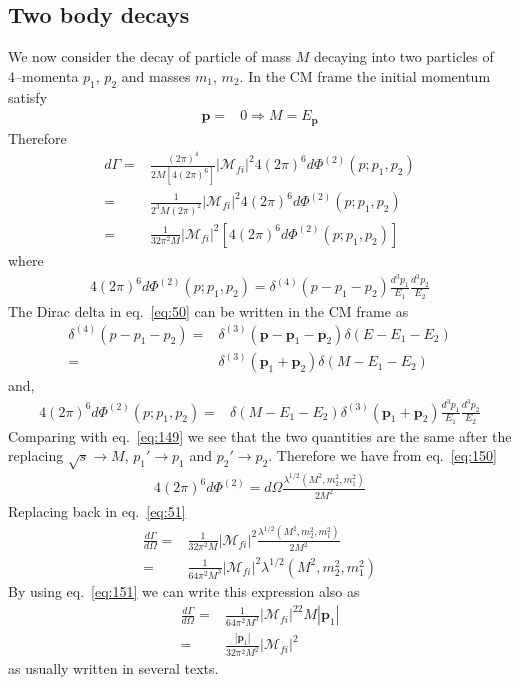 \subsection{Two body decays}
We now consider the decay of particle of mass $M$ decaying into two particles of 4--momenta $p_1$, $p_2$ and masses $m_1$, $m_2$. In the CM frame the initial momentum satisfy
\begin{align}
  \mathbf{p}=&0\Rightarrow M=E_{\mathbf{p}}
\end{align}
Therefore 
\begin{align}
  \label{eq:51}
  d\Gamma=&\frac{(2\pi)^4}{2M[4(2\pi)^6]}\left|\mathcal{M}_{fi}\right|^2
4(2\pi)^6d \Phi^{(2)} (p; p_1, p_2)\nonumber\\
=&\frac{1}{2^3M(2\pi)^2}\left|\mathcal{M}_{fi}\right|^2
4(2\pi)^6d \Phi^{(2)} (p; p_1, p_2)\nonumber\\
=&\frac{1}{32 \pi^2M}\left|\mathcal{M}_{fi}\right|^2
\left[4(2\pi)^6d \Phi^{(2)} (p; p_1, p_2)\right]
\end{align}
where
\begin{align}
  4(2\pi)^6d \Phi^{(2)} (p; p_1, p_2)=\delta^{(4)}(p-p_1-p_2)\frac{d^3p_1}{E_{1}}\frac{d^3p_2}{E_{2}}
\end{align}
The Dirac delta in eq.~\eqref{eq:50} can be written in the CM frame as
\begin{align}
\label{eq:153}
  \delta^{(4)}(p-p_1-p_2)=&\delta^{(3)}(\mathbf{p}-\mathbf{p}_1-\mathbf{p}_2)\delta(E-E_1-E_2)\nonumber\\
=&\delta^{(3)}(\mathbf{p}_1+\mathbf{p}_2)\delta(M-E_1-E_2)
\end{align}
and,
\begin{align}
   4(2\pi)^6d \Phi^{(2)} (p; p_1, p_2)=&\delta(M-E_1-E_2)\delta^{(3)}(\mathbf{p}_1+\mathbf{p}_2)\frac{d^3p_1}{E_{1}}\frac{d^3p_2}{E_{2}}
\end{align}
Comparing with eq.~\eqref{eq:149} we see that the two quantities are the same after the replacing $\sqrt{s}\to M$, $p_1'\to p_1$ and $p_2'\to p_2$. Therefore we have from eq.~\eqref{eq:150}
\begin{align}
    4(2\pi)^6d\Phi^{(2)}=d\Omega\frac{\lambda^{1/2}(M^2,m_2^2,m_1^2)}{2M^2}
\end{align}
Replacing back in eq.~\eqref{eq:51}
\begin{align}
\label{eq:152}
\frac{d\Gamma}{d\Omega}=&\frac{1}{32 \pi^2M}\left|\mathcal{M}_{fi}\right|^2\frac{\lambda^{1/2}(M^2,m_2^2,m_1^2)}{2M^2}\nonumber\\
=&\frac{1}{64 \pi^2M^3}\left|\mathcal{M}_{fi}\right|^2\lambda^{1/2}(M^2,m_2^2,m_1^2) 
\end{align}
By using eq.~\eqref{eq:151} we can write this expression also as
\begin{align}
\frac{d\Gamma}{d\Omega}
=&\frac{1}{64 \pi^2M^3}\left|\mathcal{M}_{fi}\right|^22M|\mathbf{p}_1|\nonumber\\
=&\frac{|\mathbf{p}_1|}{32 \pi^2M^2}\left|\mathcal{M}_{fi}\right|^2
\end{align}
as usually written in several texts.



